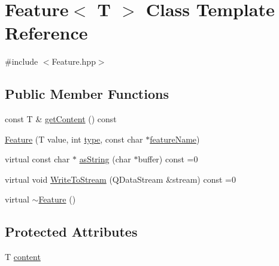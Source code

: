 \hypertarget{class_feature}{\section{Feature$<$ T $>$ Class Template Reference}
\label{class_feature}
}


{\ttfamily \#include $<$Feature.\+hpp$>$}

\subsection*{Public Member Functions}
\begin{DoxyCompactItemize}
\item 
const T \& \hyperlink{class_feature_a646c111235f484dd0ca89d122b2aac42}{get\+Content} () const 
\item 
\hyperlink{class_feature_a35e604731c88fd1aa8e8a36c87a1ce23}{Feature} (T value, int \hyperlink{class_feature_abstract_acab3574e41f892ae811b4adac8f5840a}{type}, const char $\ast$\hyperlink{class_feature_abstract_ae11ff57d87c0e49cf1cf95d71f407979}{feature\+Name})
\item 
virtual const char $\ast$ \hyperlink{class_feature_abdd71dfec0efebf4ff17aeb2bee257c3}{as\+String} (char $\ast$buffer) const =0
\item 
virtual void \hyperlink{class_feature_a75f94882fda85bc2632620ad2555c510}{Write\+To\+Stream} (Q\+Data\+Stream \&stream) const =0
\item 
virtual \hyperlink{class_feature_a93090fa295d12d22fff7c9de84d0ab20}{$\sim$\+Feature} ()
\end{DoxyCompactItemize}
\subsection*{Protected Attributes}
\begin{DoxyCompactItemize}
\item 
T \hyperlink{class_feature_a4379bdef5cd2e91346a780210c6984d9}{content}
\end{DoxyCompactItemize}


